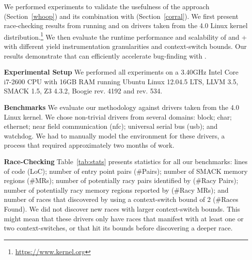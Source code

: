 We performed experiments to validate the usefulness of the \whoop approach (Section~\ref{whoop}) and its combination with \corral (Section~\ref{corral}). We first present race-checking results from running \whoop and \corral on \sizeOfBenchmarks drivers taken from the 4.0 Linux kernel distribution.\footnote{\url{https://www.kernel.org}} We then evaluate the runtime performance and scalability of \corral and \whoop + \corral with different yield instrumentation granularities and context-switch bounds.
Our results demonstrate that \whoop can efficiently accelerate bug-finding with \corral.

\noindent
\textbf{Experimental Setup}\xspace\xspace We performed all experiments on a 3.40GHz Intel Core i7-2600 CPU with 16GB RAM running Ubuntu Linux 12.04.5 LTS, LLVM 3.5, SMACK 1.5, Z3 4.3.2, Boogie rev. 4192 and \corral rev. 534.  

\noindent
\textbf{Benchmarks}\xspace\xspace We evaluate our methodology against \sizeOfBenchmarks drivers taken from the 4.0 Linux kernel. We chose non-trivial drivers from several domains: block; char; ethernet; near field communication (nfc); universal serial bus (usb); and watchdog. We had to manually model the environment for these drivers, a process that required approximately two months of work.  


\noindent
\textbf{Race-Checking}\xspace\xspace Table~\ref{tab:stats} presents statistics for all our benchmarks: lines of code (LoC); number of entry point pairs (\#Pairs); number of SMACK memory regions (\#MRs); number of potentially racy pairs identified by \whoop (\#Racy Pairs); number of potentially racy memory regions reported by \whoop (\#Racy MRs); and number of races that discovered by \corral using a context-switch bound of 2 (\#Races Found). We did not discover new races with larger context-switch bounds. This might mean that these drivers only have races that manifest with at least one or two context-switches, or that \corral hit its bounds before discovering a deeper race.

